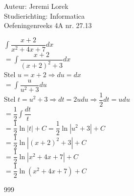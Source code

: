 \documentclass[a4paper]{article}
\begin{document}
\noindent \large Auteur: Jeremi Lorek\\
\noindent \large Studierichting: Informatica\\
\noindent \large Oefeningenreeks 4A nr. 27.13\\

\medskip
\normalsize

$\displaystyle \int \dfrac{x + 2}{x^2 + 4x + 7} dx$ \\

$= \displaystyle \int \dfrac{x + 2}{(x + 2)^2 + 3} dx$ \\

Stel $u = x + 2 \Rightarrow du = dx$\\

$= \displaystyle \int \dfrac{u}{u^2 + 3} du$ \\

Stel $t = u^2 + 3 \Rightarrow dt = 2u du \Rightarrow \dfrac{1}{2} dt = u du $\\

$= \dfrac{1}{2} \displaystyle \int \dfrac{dt}{t}$ \\

$= \dfrac{1}{2} \ln |t| + C = \dfrac{1}{2} \ln |u^2 + 3| + C$ \\

$= \dfrac{1}{2} \ln \left| (x + 2)^2 + 3 \right| + C$ \\

$= \dfrac{1}{2} \ln \left| x^2 + 4x + 7 \right| + C$ \\

$= \dfrac{1}{2} \ln (x^2 + 4x + 7) + C$ \\

\begin{thebibliography}{999}
\end{thebibliography}
\end{document}
